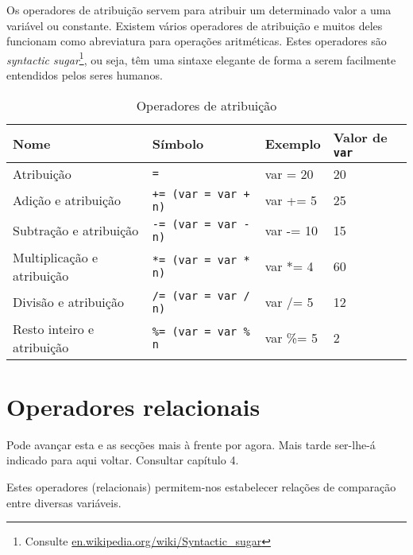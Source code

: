 Os operadores de atribuição servem para atribuir um determinado valor a uma variável ou constante. Existem vários operadores de atribuição e muitos deles funcionam como abreviatura para operações aritméticas. Estes operadores são \textit{syntactic sugar}\footnote{Consulte \color{links}\href{http://en.wikipedia.org/wiki/Syntactic\_sugar}{en.wikipedia.org/wiki/Syntactic\_sugar}}, ou seja, têm uma sintaxe elegante de forma a serem facilmente entendidos pelos seres humanos.

\begin{table}[h]
\center\begin{tabular}{|l|l|l|l|}
\hline
\textbf{Nome}				&	\textbf{Símbolo}    			& \textbf{Exemplo} 	& \textbf{Valor de \texttt{var}} \\ \hline
Atribuição					&	\texttt{=}                   	& var = 20 			& 20     \\ \hline
Adição e atribuição			&	\texttt{+= (var = var + n)} 	& var += 5 			& 25     \\ \hline
Subtração e atribuição		&	\texttt{-= (var = var - n)}  	& var -= 10			& 15    \\ \hline
Multiplicação e atribuição	&	\texttt{*= (var = var * n)}  	& var *= 4			& 60     \\ \hline
Divisão e atribuição		&	\texttt{/= (var = var / n)}  	& var /= 5 			& 12    \\ \hline
Resto inteiro e atribuição	&	\texttt{\%= (var = var \% n}	& var \%= 5 		& 2     \\ \hline
\end{tabular}
\caption{Operadores de atribuição}
\end{table}

\section{Operadores relacionais}

\begin{mdframed}[backgroundcolor=cinzaclaro, linewidth=0pt]
Pode avançar esta e as secções mais à frente por agora. Mais tarde ser-lhe-á indicado para aqui voltar. Consultar capítulo 4.
\end{mdframed}

Estes operadores (relacionais) permitem-nos estabelecer relações de comparação entre diversas variáveis.

